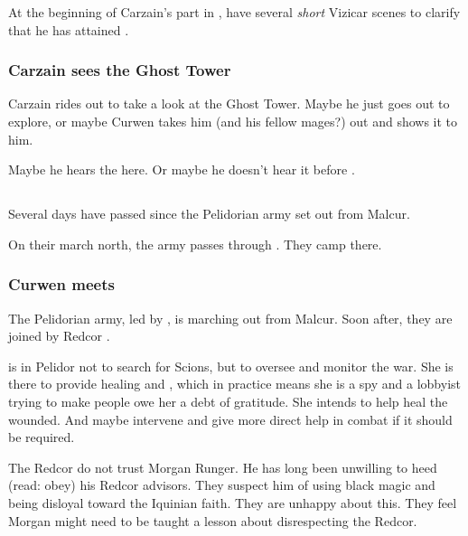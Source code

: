 \begin{garbage}
At the beginning of Carzain's part in \emph{\TwilightAngelRemember}, have several \emph{short} Vizicar scenes to clarify that he has attained \kenosis. 




\subsubsection{Carzain sees the Ghost Tower}
Carzain rides out to take a look at the Ghost Tower. Maybe he just goes out to explore, or maybe Curwen takes him (and his fellow mages?) out and shows it to him. 

Maybe he hears the  here. Or maybe he doesn't hear it before .







\subsection{\Forklin}
Several days have passed since the Pelidorian army set out from Malcur. 

On their march north, the army passes through \Forklin. They camp there. 





\subsubsection{Curwen meets \Esmerel}
The Pelidorian army, led by , is marching out from Malcur. Soon after, they are joined by Redcor \Matron{} \Esmerel. 

\Esmerel{} is in Pelidor not to search for Scions, but to oversee and monitor the war. 
She is there to provide healing and , which in practice means she is a spy and a lobbyist trying to make people owe her a debt of gratitude. 
She intends to help heal the wounded. 
And maybe intervene and give more direct help in combat if it should be required. 

The Redcor do not trust Morgan Runger. 
He has long been unwilling to heed (read: obey) his Redcor advisors. 
They suspect him of using black magic and being disloyal toward the Iquinian faith. 
They are unhappy about this. 
They feel Morgan might need to be taught a lesson about disrespecting the Redcor. 


\end{garbage}
